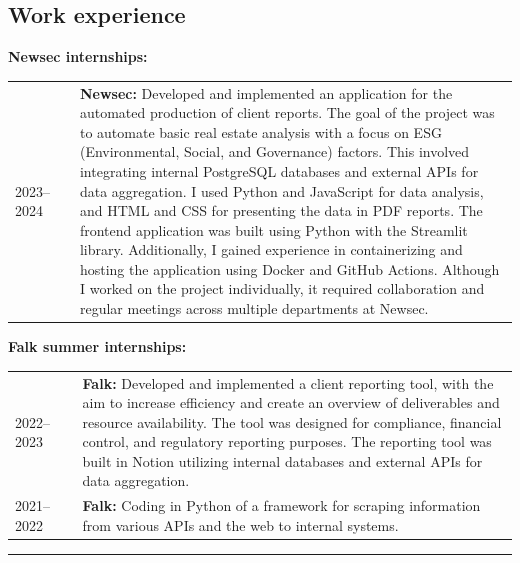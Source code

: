 \documentclass[10pt]{article}
\newlength{\cw}
\newlength{\cwl}
\begin{document}
\subsection*{Work experience}
 
\textbf{Newsec internships:}

\begin{tabular}{p{\cw} @{:}l p{\cwl}}
  2023--2024 & & \textbf{Newsec:} Developed and implemented an application for the automated production of client reports.
  The goal of the project was to automate basic real estate analysis with a focus on ESG (Environmental, Social, and Governance) factors.
  This involved integrating internal PostgreSQL databases and external APIs for data aggregation.
  I used Python and JavaScript for data analysis, and HTML and CSS for presenting the data in PDF reports.
  The frontend application was built using Python with the Streamlit library.
  Additionally, I gained experience in containerizing and hosting the application using Docker and GitHub Actions.
  Although I worked on the project individually, it required collaboration and regular meetings across multiple departments at Newsec.
  \\
\end{tabular}

\textbf{Falk summer internships:}

\begin{tabular}{p{\cw} @{:}l p{\cwl}}
  2022--2023 & & \textbf{Falk:} Developed and implemented a client reporting tool, with the aim to increase efficiency and create an overview of deliverables and resource availability.
  The tool was designed for compliance, financial control, and regulatory reporting purposes. The reporting tool was built in Notion utilizing internal databases and external APIs for data aggregation.\\
  2021--2022 & & \textbf{Falk:} Coding in Python of a framework for scraping information from various APIs and the web to internal systems.
\end{tabular}

\vspace{0.1cm}
\hrule
\vspace{0.1cm}
\end{document}
